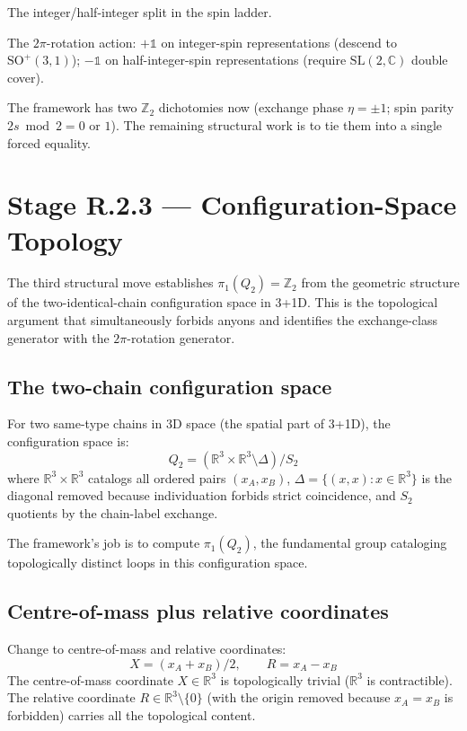 \documentclass[11pt,a4paper]{article}
\begin{document}
The integer/half-integer split in the spin ladder.

The $2\pi$-rotation action: $+\mathbb{1}$ on integer-spin representations (descend to $\mathrm{SO}^+(3,1)$); $-\mathbb{1}$ on half-integer-spin representations (require $\mathrm{SL}(2,\mathbb{C})$ double cover).

The framework has two $\mathbb{Z}_2$ dichotomies now (exchange phase $\eta = \pm 1$; spin parity $2s \bmod 2 = 0$ or $1$). The remaining structural work is to tie them into a single forced equality.

\section{Stage R.2.3 --- Configuration-Space Topology}

The third structural move establishes $\pi_1(Q_2) = \mathbb{Z}_2$ from the geometric structure of the two-identical-chain configuration space in 3+1D. This is the topological argument that simultaneously forbids anyons and identifies the exchange-class generator with the $2\pi$-rotation generator.

\subsection{The two-chain configuration space}

For two same-type chains in 3D space (the spatial part of 3+1D), the configuration space is:
\[
Q_2 = (\mathbb{R}^{3} \times \mathbb{R}^{3} \setminus \Delta) / S_2
\]
where $\mathbb{R}^{3} \times \mathbb{R}^{3}$ catalogs all ordered pairs $(x_A, x_B)$, $\Delta = \{(x, x) : x \in \mathbb{R}^{3}\}$ is the diagonal removed because individuation forbids strict coincidence, and $S_2$ quotients by the chain-label exchange.

The framework's job is to compute $\pi_1(Q_2)$, the fundamental group cataloging topologically distinct loops in this configuration space.

\subsection{Centre-of-mass plus relative coordinates}

Change to centre-of-mass and relative coordinates:
\[
X = (x_A + x_B)/2, \qquad R = x_A - x_B
\]
The centre-of-mass coordinate $X \in \mathbb{R}^{3}$ is topologically trivial ($\mathbb{R}^{3}$ is contractible). The relative coordinate $R \in \mathbb{R}^{3} \setminus \{0\}$ (with the origin removed because $x_A = x_B$ is forbidden) carries all the topological content.
\end{document}
